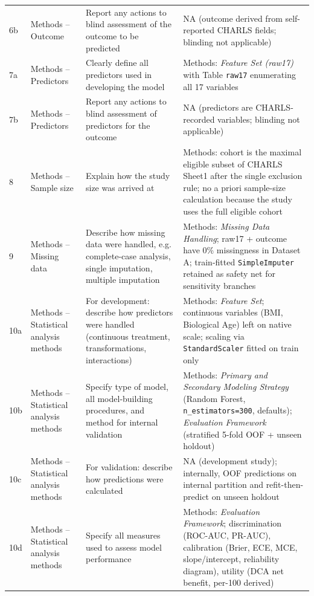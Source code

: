 \documentclass[11pt,a4paper]{article}
\begin{document}
\begin{longtable}{p{0.9cm} p{2.8cm} p{4.6cm} p{6.6cm}}
6b & Methods -- Outcome & Report any actions to blind assessment of the outcome to be predicted & NA (outcome derived from self-reported CHARLS fields; blinding not applicable) \\
7a & Methods -- Predictors & Clearly define all predictors used in developing the model & Methods: \emph{Feature Set (raw17)} with Table \texttt{raw17} enumerating all 17 variables \\
7b & Methods -- Predictors & Report any actions to blind assessment of predictors for the outcome & NA (predictors are CHARLS-recorded variables; blinding not applicable) \\
8 & Methods -- Sample size & Explain how the study size was arrived at & Methods: cohort is the maximal eligible subset of CHARLS Sheet1 after the single exclusion rule; no a priori sample-size calculation because the study uses the full eligible cohort \\
9 & Methods -- Missing data & Describe how missing data were handled, e.g. complete-case analysis, single imputation, multiple imputation & Methods: \emph{Missing Data Handling}; raw17 + outcome have 0\% missingness in Dataset A; train-fitted \texttt{SimpleImputer} retained as safety net for sensitivity branches \\
10a & Methods -- Statistical analysis methods & For development: describe how predictors were handled (continuous treatment, transformations, interactions) & Methods: \emph{Feature Set}; continuous variables (BMI, Biological Age) left on native scale; scaling via \texttt{StandardScaler} fitted on train only \\
10b & Methods -- Statistical analysis methods & Specify type of model, all model-building procedures, and method for internal validation & Methods: \emph{Primary and Secondary Modeling Strategy} (Random Forest, \texttt{n\_estimators=300}, defaults); \emph{Evaluation Framework} (stratified 5-fold OOF + unseen holdout) \\
10c & Methods -- Statistical analysis methods & For validation: describe how predictions were calculated & NA (development study); internally, OOF predictions on internal partition and refit-then-predict on unseen holdout \\
10d & Methods -- Statistical analysis methods & Specify all measures used to assess model performance & Methods: \emph{Evaluation Framework}; discrimination (ROC-AUC, PR-AUC), calibration (Brier, ECE, MCE, slope/intercept, reliability diagram), utility (DCA net benefit, per-100 derived) \\

\end{longtable}
\end{document}
